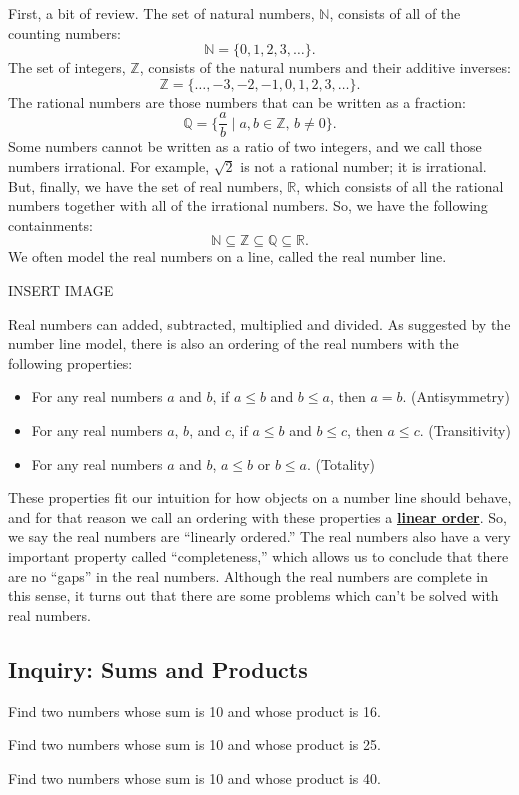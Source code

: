 \documentclass[11pt]{article}
\newenvironment{task}
	{\begin{mdframed}[linecolor=lightgray, linewidth=3pt]\raggedright}
	{\end{mdframed}}
\renewcommand\emph[1]{\underline{\bf{#1}}} %
\theoremstyle{definition}
\begin{document}
First, a bit of review. The set of natural numbers, $\mathbb{N}$, consists of all of the counting numbers:
\[ \mathbb{N} = \{ 0, 1, 2, 3, \dots \}.\]
The set of integers, $\mathbb{Z}$, consists of the natural numbers and their additive inverses:
\[ \mathbb{Z} = \{ \dots,-3,-2,-1,0, 1, 2, 3, \dots \}.\]
The rational numbers are those numbers that can be written as a fraction:
\[ \mathbb{Q} = \{ \frac{a}{b} \mid a, b\in \mathbb{Z},\, b \neq 0 \}.\]
Some numbers cannot be written as a ratio of two integers, and we call those numbers irrational. For example, $\sqrt{2}$ is not a rational number; it is
irrational. But, finally, we have the set of real numbers, $\mathbb{R}$, which consists of all the rational numbers together with all of the irrational numbers. 
So, we have the following containments:
\[ \mathbb{N} \subseteq \mathbb{Z} \subseteq \mathbb{Q} \subseteq \mathbb{R}.\]
We often model the real numbers on a line, called the real number line. 
\begin{center}
  INSERT IMAGE
\end{center}
Real numbers can added, subtracted, multiplied and divided. As suggested by the number line model, there is also an ordering of the real 
numbers with the following properties:
\begin{itemize}
  \item For any real numbers $a$ and $b$, if $a\leq b$ and $b\leq a$, then $a=b$. (Antisymmetry)
  \item For any real numbers $a$, $b$, and $c$, if $a \leq b$ and $b\leq c$, then $a\leq c$. (Transitivity)
  \item For any real numbers $a$ and $b$, $a\leq b$ or $b\leq a$. (Totality)
\end{itemize}

These properties fit our intuition for how objects on a number line should behave, and for that reason we call an ordering with these properties a 
\emph{linear order}. So, we say the real numbers are ``linearly ordered.'' The real numbers also have a very important property called ``completeness,'' 
which allows us to conclude that there are no ``gaps'' in the real numbers. Although the real numbers are complete in this sense, it turns out that there 
are some problems which can't be solved with real numbers.

\subsection{Inquiry: Sums and Products}
\begin{task}
  Find two numbers whose sum is 10 and whose product is 16.

  Find two numbers whose sum is 10 and whose product is 25.

  Find two numbers whose sum is 10 and whose product is 40.
\end{task}
\end{document}

